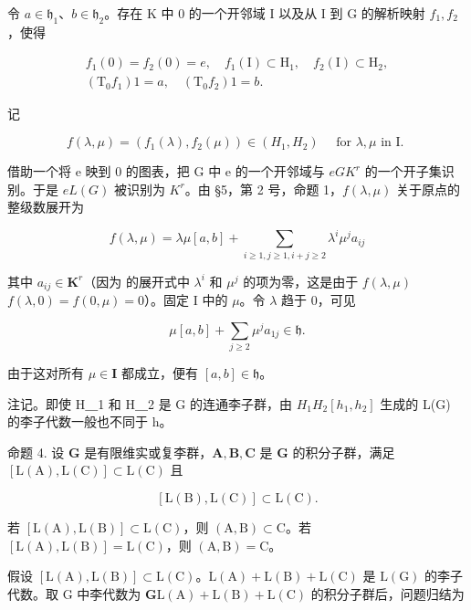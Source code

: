 令 \(a \in \mathfrak{h}_1\)、\(b \in \mathfrak{h}_2\)。存在 K 中 0 的一个开邻域 I 以及从 I 到 G 的解析映射 \(f_1, f_2\)，使得

\[
\begin{array}{c} f _ {1} (0) = f _ {2} (0) = e, \quad f _ {1} (\mathrm{I}) \subset \mathrm{H} _ {1}, \quad f _ {2} (\mathrm{I}) \subset \mathrm{H} _ {2}, \\ (\mathrm{T} _ {0} f _ {1}) 1 = a, \quad (\mathrm{T} _ {0} f _ {2}) 1 = b. \end{array}
\]

记

\[
f (\lambda , \mu) = (f _ {1} (\lambda), f _ {2} (\mu)) \in (H _ {1}, H _ {2}) \quad \text { for   } \lambda , \mu \text {   in   I. }
\]

借助一个将 e 映到 0 的图表，把 G 中 e 的一个开邻域与 \(e\)\(G\)\(K^r\) 的一个开子集识别。于是 \(e\)\(L(G)\) 被识别为 \(K^r\)。由 §5，第 2 号，命题 1，\(f(\lambda, \mu)\) 关于原点的整级数展开为

\[
f (\lambda , \mu) = \lambda \mu [ a, b ] + \sum_ {i \geqslant 1, j \geqslant 1, i + j \geqslant 2} \lambda^ {i} \mu^ {j} a _ {i j}
\]

其中 \(a_{ij} \in \mathbf{K}^r\)（因为  的展开式中 \(\lambda^i\) 和 \(\mu^j\) 的项为零，这是由于 \(f(\lambda, \mu)\)\(f(\lambda, 0) = f(0, \mu) = 0\)）。固定 I 中的 \(\mu\)。令 \(\lambda\) 趋于 0，可见

\[
\mu [ a, b ] + \sum_ {j \geqslant 2} \mu^ {j} a _ {1 j} \in \mathfrak {h}.
\]

由于这对所有 \(\mu\in\mathbf{I}\) 都成立，便有 \([a,b]\in\mathfrak{h}\)。

注记。即使 H＿1 和 H＿2 是 G 的连通李子群，由 \(H_{1}\)\(H_{2}\)\([h_{1}, h_{2}]\) 生成的 L(G) 的李子代数一般也不同于 h。

命题 4. 设 \(\mathbf{G}\) 是有限维实或复李群，\(\mathbf{A}, \mathbf{B}, \mathbf{C}\) 是 \(\mathbf{G}\) 的积分子群，满足 \([\mathrm{L}(\mathrm{A}), \mathrm{L}(\mathrm{C})] \subset \mathrm{L}(\mathrm{C})\) 且

\[
[ \mathrm{L} (\mathrm{B}), \mathrm{L} (\mathrm{C}) ] \subset \mathrm{L} (\mathrm{C}).
\]

若 \([\mathrm{L}(\mathrm{A}),\mathrm{L}(\mathrm{B})]\subset \mathrm{L}(\mathrm{C})\)，则 \((\mathrm{A},\mathrm{B})\subset \mathrm{C}\)。若 \([\mathrm{L}(\mathrm{A}),\mathrm{L}(\mathrm{B})] = \mathrm{L}(\mathrm{C})\)，则 \((\mathrm{A},\mathrm{B}) = \mathrm{C}\)。

假设 \([\mathrm{L}(\mathrm{A}),\mathrm{L}(\mathrm{B})]\subset \mathrm{L}(\mathrm{C})\)。\(\mathrm{L}(\mathrm{A}) + \mathrm{L}(\mathrm{B}) + \mathrm{L}(\mathrm{C})\) 是 \(\mathrm{L}(\mathrm{G})\) 的李子代数。取 G 中李代数为 \(\mathbf{G}\)\(\mathrm{L}(\mathrm{A}) + \mathrm{L}(\mathrm{B}) + \mathrm{L}(\mathrm{C})\) 的积分子群后，问题归结为

